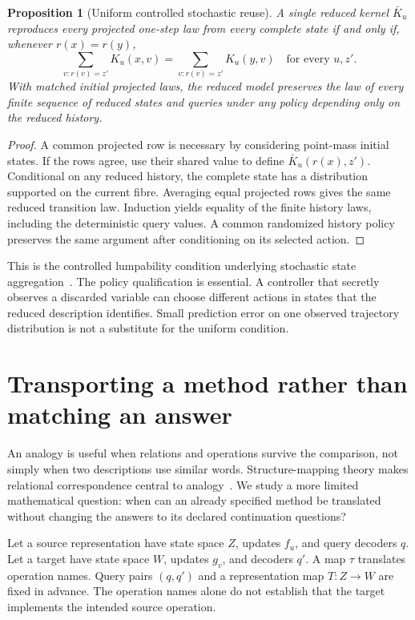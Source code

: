 \documentclass[11pt,letterpaper]{article}
\theoremstyle{plain}
\newtheorem{proposition}[theorem]{Proposition}
\theoremstyle{definition}
\begin{document}
\begin{proposition}[Uniform controlled stochastic reuse]\label{prop:lumpability}
A single reduced kernel $\bar K_u$ reproduces every projected one-step law from every complete state if and only if, whenever $r(x)=r(y)$,
\[
\sum_{v:r(v)=z'}K_u(x,v)=\sum_{v:r(v)=z'}K_u(y,v)
\quad\text{for every }u,z'.
\]
With matched initial projected laws, the reduced model preserves the law of every finite sequence of reduced states and queries under any policy depending only on the reduced history.
\end{proposition}
\begin{proof}
A common projected row is necessary by considering point-mass initial states. If the rows agree, use their shared value to define $\bar K_u(r(x),z')$. Conditional on any reduced history, the complete state has a distribution supported on the current fibre. Averaging equal projected rows gives the same reduced transition law. Induction yields equality of the finite history laws, including the deterministic query values. A common randomized history policy preserves the same argument after conditioning on its selected action.
\end{proof}
This is the controlled lumpability condition underlying stochastic state aggregation~\cite{givan}. The policy qualification is essential. A controller that secretly observes a discarded variable can choose different actions in states that the reduced description identifies. Small prediction error on one observed trajectory distribution is not a substitute for the uniform condition.

\section{Transporting a method rather than matching an answer}\label{sec:transport}
An analogy is useful when relations and operations survive the comparison, not simply when two descriptions use similar words. Structure-mapping theory makes relational correspondence central to analogy~\cite{gentner}. We study a more limited mathematical question: when can an already specified method be translated without changing the answers to its declared continuation questions?

Let a source representation have state space $Z$, updates $f_u$, and query decoders $q$. Let a target have state space $W$, updates $g_v$, and decoders $q'$. A map $\tau$ translates operation names. Query pairs $(q,q')$ and a representation map $T:Z\to W$ are fixed in advance. The operation names alone do not establish that the target implements the intended source operation.
\end{document}
